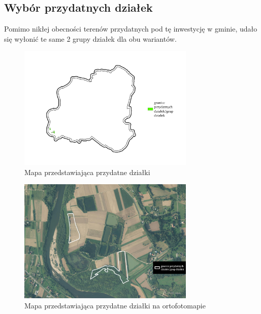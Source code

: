 \documentclass{article}
\begin{document}
\subsection{Wybór przydatnych działek}

Pomimo nikłej obecności terenów przydatnych pod tę inwestycję w gminie, udało się wyłonić te same 2 grupy działek dla obu wariantów.

\begin{figure}[H]
    \centering
    \includegraphics[width=0.75\textwidth]{img/plesna-przydatne-dzialki.jpg}
    \caption{Mapa przedstawiająca przydatne działki}
\end{figure}

\begin{figure}[H]
    \centering
    \includegraphics[width=0.75\textwidth]{img/plesna-dzialki-przydatne-ortofoto.jpg}
    \caption{Mapa przedstawiająca przydatne działki na ortofotomapie}
\end{figure}
\end{document}
